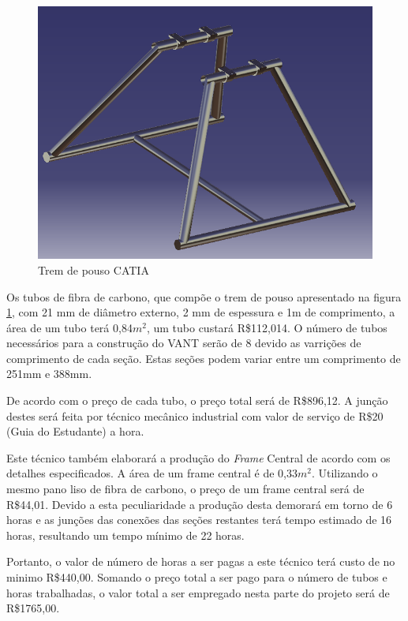\begin{figure}[H]
    \centering
      \includegraphics[keepaspectratio=true,scale=0.5]{figuras/frame_central.png}
    \caption{Trem de pouso CATIA}
    \label{fig:frame_central}
\end{figure}

Os tubos de fibra de carbono, que compõe o trem de pouso apresentado na figura \ref{fig:frame_central},
com 21 mm de diâmetro externo, 2 mm de espessura e 1m de comprimento, a área de um tubo terá 0,84$m^2$, 
um tubo custará R\$112,014. O número de tubos
necessários para a construção do VANT serão de 8 devido as varrições de comprimento de cada 
seção.  Estas seções podem variar entre um comprimento de 251mm e 388mm.

De acordo com o preço de cada tubo, o preço total será de R\$896,12. A junção destes será feita
por técnico mecânico industrial com valor de serviço de R\$20 (Guia do Estudante)\footnotemark 
a hora.


Este técnico também elaborará a produção do \textit{Frame} Central de acordo com os detalhes especificados.
A área de um frame central é de 0,33$m^2$. Utilizando o mesmo pano liso de fibra de carbono, 
o preço de um frame central será de R\$44,01.  Devido a esta peculiaridade a produção desta
demorará em torno de 6 horas e as junções das conexões das seções restantes terá tempo estimado
de 16 horas,  resultando um tempo mínimo de 22 horas.

Portanto, o valor de número de horas a ser pagas a este técnico terá custo de no minimo
R\$440,00. Somando o preço total a ser pago para o número de tubos e horas trabalhadas,
o valor total a ser empregado nesta parte do projeto será de R\$1765,00.

